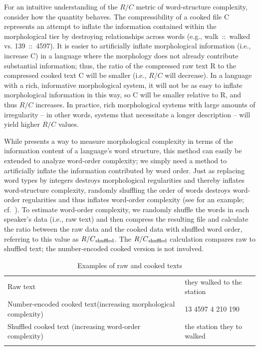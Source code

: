 \documentclass[output=paper]{langscibook}
\begin{document}
For an intuitive understanding of the $R/C$ metric of word-structure complexity, consider how the quantity behaves. The compressibility of a cooked file C represents an attempt to inflate the information contained within the morphological tier by destroying relationships across words (e.g., walk~::~walked vs. 139~::~4597). It is easier to artificially inflate morphological information (i.e., increase C) in a language where the morphology does not already contribute substantial information; thus, the ratio of the compressed raw text R to the compressed cooked text C will be smaller (i.e., $R/C$ will decrease). In a language with a rich, informative morphological system, it will not be as easy to inflate morphological information in this way, so C will be smaller relative to R, and thus 
$R/C$ increases. In practice, rich morphological systems with large amounts of irregularity -- in other words, systems that necessitate a longer description -- will yield higher $R/C$ values.

While \citet{juola1998measuring} presents a way to measure morphological complexity in terms of the information content of a language's word structure, this method can easily be extended to analyze word-order complexity; we simply need a method to artificially inflate the information contributed by word order. Just as replacing word types by integers destroys morphological regularities and thereby inflates word-structure complexity, randomly shuffling the order of words destroys word-order regularities and thus inflates word-order complexity (see  for an example; cf.~\citealp{koplenig2017statistical}). To estimate word-order complexity, we randomly shuffle the words in each speaker's data (i.e., raw text) and then compress the resulting file and calculate the ratio between the raw data and the cooked data with shuffled word order, referring to this value as $R/C\textsubscript{shuffled}$.  
The $R/C\textsubscript{shuffled}$ calculation compares raw to shuffled text; the number-encoded cooked version is not involved.

\begin{table}
\begin{tabularx}{\textwidth}{Ql}
\lsptoprule
{Raw text}       & they walked to the station\\
\tablevspace
Number-encoded cooked text\newline  (increasing morphological complexity) & 13   4597   4   210    190 \\
\tablevspace
 Shuffled cooked text \newline (increasing word-order complexity)      & the station they to walked  \\
\lspbottomrule
\end{tabularx}
\caption{Examples of raw and cooked texts}
\label{table:example_text}
\end{table}
\end{document}
